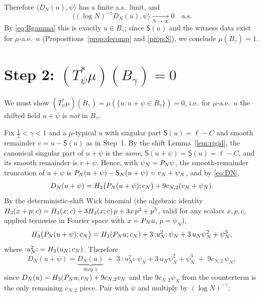 Therefore $\langle D_N(u),\psi\rangle$ has a finite a.s.\ limit, and
\[
\bigl\langle(\log N)^{-\gamma}D_N(u),\psi\bigr\rangle\xrightarrow[N\to\infty]{}0\quad\text{a.s.}
\]
By \eqref{eq:Bgamma} this is exactly $u\in B_\gamma$; since
$\mathsf S(u)$ and the witness data exist for $\mu$-a.e.\ $u$
(Propositions~\ref{prop:decomp} and \ref{prop:S}), we conclude $\mu(B_\gamma)=1$.

\section*{Step 2: $(T_\psi^*\mu)(B_\gamma)=0$}

We must show $(T_\psi^*\mu)(B_\gamma)=\mu(\{u:u+\psi\in B_\gamma\})=0$, i.e.\ for
$\mu$-a.e.\ $u$ the shifted field $u+\psi$ is \emph{not} in $B_\gamma$.

\smallskip
Fix $\tfrac12<\gamma<1$ and a $\mu$-typical $u$ with singular part
$\mathsf S(u)=\ell-C$ and smooth remainder $v=u-\mathsf S(u)$ as in Step~1. By the
shift Lemma~\ref{lem:rigid}, the canonical singular part of $u+\psi$ is the
\emph{same}, $\mathsf S(u+\psi)=\mathsf S(u)=\ell-C$, and its smooth remainder is
$v+\psi$. Hence, with $\psi_N=P_N\psi$, the smooth-remainder truncation of
$u+\psi$ is $P_N(u+\psi)-\mathsf S_N(u+\psi)=v_N+\psi_N$, and by \eqref{eq:DN},
\[
D_N(u+\psi)=H_3\bigl(P_N(u+\psi);c_N\bigr)+9c_{N,2}(v_N+\psi_N).
\]
By the deterministic-shift Wick binomial (the algebraic identity
$H_3(x+p;c)=H_3(x;c)+3H_2(x;c)\,p+3x\,p^2+p^3$, valid for any
scalars $x,p,c$, applied termwise in Fourier space with $x=P_N u$,
$p=\psi_N$),
\[
H_3\bigl(P_N(u+\psi);c_N\bigr)
=H_3(P_N u;c_N)+3\,{:}u_N^2{:}\,\psi_N+3\,u_N\psi_N^2+\psi_N^3 ,
\]
where ${:}u_N^2{:}=H_2(u_N;c_N)$. Therefore
\begin{equation}\label{eq:DNshift}
D_N(u+\psi)=\underbrace{D_N(u)}_{\text{Step 1}}
\;+\;3\,{:}u_N^2{:}\,\psi_N+3\,u_N\psi_N^2+\psi_N^3
\;+\;9c_{N,2}\,\psi_N ,
\end{equation}
since $D_N(u)=H_3(P_N u;c_N)+9c_{N,2}v_N$ and the $9c_{N,2}\psi_N$ from the
counterterm is the only remaining $c_{N,2}$ piece. Pair with $\psi$ and multiply by
$(\log N)^{-\gamma}$:
